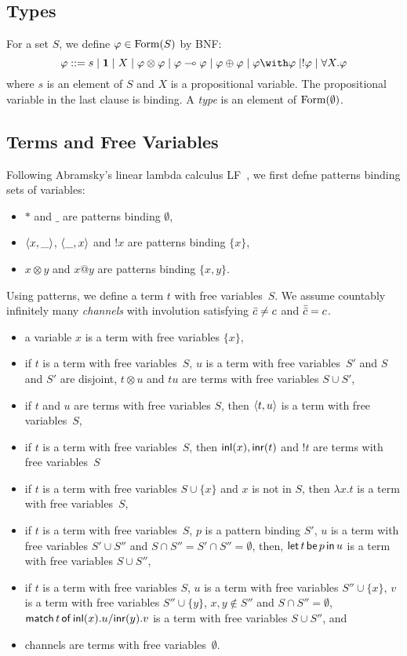 \subsection{Types}
For a set $S$, we define $\varphi\in\mathop{\text{Form}}(S)$ by BNF:
\[
 \phi::=s\mid \one \mid X \mid \phi\otimes\phi\mid \phi\limp\phi\mid
 \phi\oplus\phi\mid \phi\with\phi\mid !\phi\mid \forall X.\phi
\]
where $s$ is an element of $S$ and $X$ is a propositional variable.
The propositional variable in the last clause is binding.
A \textit{type} is an element of $\mathop{\text{Form}}(\emptyset)$.

\subsection{Terms and Free Variables}

Following Abramsky's linear lambda calculus
LF~\citep{abramsky1993computational}, we first defne patterns
binding sets of variables:
\begin{itemize}
 \item $\ast$ and $\_$ are patterns binding $\emptyset$,
 \item $\langle{x,\_}\rangle$, $\langle{\_,x}\rangle$ and $!x$ are patterns binding
       $\{x\}$,
 \item $x\otimes y$ and $x@y$ are patterns binding $\{x,y\}$.
\end{itemize}
Using patterns, we define a term $t$ with free variables~$S$.
We assume countably infinitely many \textit{channels}
with involution
satisfying $\bar{c}\neq c$ and $\bar{\bar{c}} = c$.
\begin{itemize}
 \item a variable $x$ is a term with free variables $\{x\}$,
 \item if $t$ is a term with free variables~$S$, $u$ is a term with
       free variables~$S'$ and $S$ and $S'$ are disjoint, $t\otimes u$ and
       $tu$ are terms with free variables $S\cup S'$,
 \item if $t$ and $u$ are terms with free variables $S$, then
       $\langle{t,u}\rangle$ is a term with free variables~$S$,
 \item if $t$ is a term with free variables~$S$, then
       $\mathsf{inl}({x}), \mathsf{inr}({t})$ and $!t$ are terms with free variables~$S$
 \item if $t$ is a term with free variables $S\cup \{x\}$ and $x$ is not
       in $S$, then $\lambda x.t$ is a term with free variables~$S$,
 \item if $t$ is a term with free variables~$S$, $p$ is a pattern
       binding $S'$, $u$ is a term with free variables $S'\cup S''$ and
       $S\cap S'' = S'\cap S'' = \emptyset$, then,
       $\mathsf{let }\,{t}\,\mathsf{ be }\,{p}\,\mathsf{ in }\,{u}$ is a term with free variables $S\cup S''$,
 \item if $t$ is a term with free variables $S$,
       $u$ is a term with free variables $S''\cup \{x\}$,
       $v$ is a term with free variables $S''\cup \{y\}$,
       $x,y\notin S''$ and $S\cap S'' = \emptyset$,
       $\mathsf{match}\,{t}\,\mathsf{of}\, \mathsf{inl}({x}). {u}/ \mathsf{inr}({y}). {v}$ is a term with free variables $S\cup S''$, and
 \item channels are terms with free variables~$\emptyset$.
\end{itemize}

